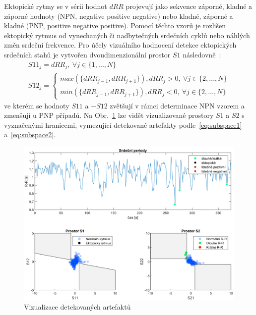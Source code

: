 Ektopické rytmy se v sérii hodnot $dRR$ projevují jako sekvence záporné, kladné
a záporné hodnoty (NPN, negative positive negative) nebo kladné, záporné a
kladné (PNP, positive negative positive). Pomocí těchto vzorů je rozlišen
ektopický rytmus od vynechaných či nadbytečných srdečních cyklů nebo náhlých
změn srdeční frekvence. Pro účely vizuálního hodnocení detekce ektopických
srdečních stahů je vytvořen dvoudimenzionální prostor $S1$
následovně~\cite{Lipponen2019}:
\begin{gather}
    S11_j = dRR_j, ~\forall j \in \{1,...,N\} \nonumber \\
    S12_j =
    \begin{cases}
        max(\{dRR_{j-1}, dRR_{j+1}\}), dRR_j > 0, ~\forall j \in \{2,...,N\} \\
        min(\{dRR_{j-1}, dRR_{j+1}\}), dRR_j < 0, ~\forall j \in \{2,...,N\}
    \end{cases}
    \label{eq:subspace1}
\end{gather}
ve kterém se hodnoty $S11$ a $-S12$ zvětšují v rámci determinace NPN vzorem a
zmenšují u PNP případů. Na Obr.~\ref{fig:rr_process} lze vidět vizualizované
prostory $S1$ a $S2$ s vyznačenými hranicemi, vymezující detekované artefakty
podle~\eqref{eq:subspace1} a~\eqref{eq:subspace2}.

\begin{figure}[h]
    \begin{center}
        \includegraphics[width=1\textwidth]{../assets/figures/rr_process}
        \caption{Vizualizace detekovaných artefaktů}
        \label{fig:rr_process}
    \end{center}
\end{figure}

